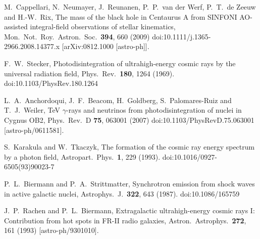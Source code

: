 \documentclass[aps,prd,twocolumn,superscriptaddress,tightenlines,nofootinbib]{revtex4-1}
\begin{document}
\begin{thebibliography}{99}
  M.~Cappellari, N.~Neumayer, J.~Reunanen, P.~P.~van der Werf, P.~T.~de Zeeuw and H.-W.~Rix,
    {\color{rossoCP3} The mass of the black hole in Centaurus A from SINFONI AO-assisted integral-field observations of stellar kinematics},
  Mon.\ Not.\ Roy.\ Astron.\ Soc.\  {\bf 394}, 660 (2009)
  doi:10.1111/j.1365-2966.2008.14377.x
  [arXiv:0812.1000 [astro-ph]].








  F.~W.~Stecker,
 {\color{rossoCP3}  Photodisintegration of ultrahigh-energy cosmic rays by the universal radiation field},
  Phys.\ Rev.\  {\bf 180}, 1264 (1969).
  doi:10.1103/PhysRev.180.1264


  L.~A.~Anchordoqui, J.~F.~Beacom, H.~Goldberg, S.~Palomares-Ruiz and T.~J.~Weiler,
  {\color{rossoCP3} TeV $\gamma$-rays and neutrinos from photodisintegration of nuclei in Cygnus OB2},
  Phys.\ Rev.\ D {\bf 75}, 063001 (2007)
  doi:10.1103/PhysRevD.75.063001
  [astro-ph/0611581].


  S.~Karakula and W.~Tkaczyk,
  {\color{rossoCP3}  The formation of the cosmic ray energy spectrum by a photon field},
  Astropart.\ Phys.\  {\bf 1}, 229 (1993).
  doi:10.1016/0927-6505(93)90023-7


  P.~L.~Biermann and P.~A.~Strittmatter,
    {\color{rossoCP3} Synchrotron emission from shock waves in active galactic nuclei},
  Astrophys.\ J.\  {\bf 322}, 643 (1987).
  doi:10.1086/165759


  J.~P.~Rachen and P.~L.~Biermann,
    {\color{rossoCP3} Extragalactic ultrahigh-energy cosmic rays I: Contribution from hot spots in FR-II radio galaxies},
  Astron.\ Astrophys.\  {\bf 272}, 161 (1993)
  [astro-ph/9301010].





\end{thebibliography}
\end{document}
